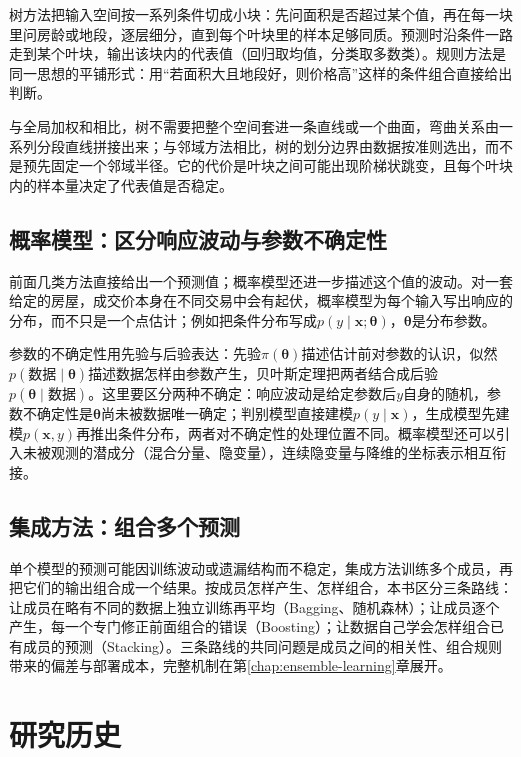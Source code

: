 树方法把输入空间按一系列条件切成小块：先问面积是否超过某个值，再在每一块里问房龄或地段，逐层细分，直到每个叶块里的样本足够同质。预测时沿条件一路走到某个叶块，输出该块内的代表值（回归取均值，分类取多数类）。规则方法是同一思想的平铺形式：用“若面积大且地段好，则价格高”这样的条件组合直接给出判断。

与全局加权和相比，树不需要把整个空间套进一条直线或一个曲面，弯曲关系由一系列分段直线拼接出来；与邻域方法相比，树的划分边界由数据按准则选出，而不是预先固定一个邻域半径。它的代价是叶块之间可能出现阶梯状跳变，且每个叶块内的样本量决定了代表值是否稳定。

\subsection{概率模型：区分响应波动与参数不确定性}
\label{sec:classic-overview-probability}

前面几类方法直接给出一个预测值；概率模型还进一步描述这个值的波动。对一套给定的房屋，成交价本身在不同交易中会有起伏，概率模型为每个输入写出响应的分布，而不只是一个点估计；例如把条件分布写成$p(y\mid\bm x;\bm\theta)$，$\bm\theta$是分布参数。

参数的不确定性用先验与后验表达：先验$\pi(\bm\theta)$描述估计前对参数的认识，似然$p(\text{数据}\mid\bm\theta)$描述数据怎样由参数产生，贝叶斯定理把两者结合成后验$p(\bm\theta\mid\text{数据})$。这里要区分两种不确定：响应波动是给定参数后$y$自身的随机，参数不确定性是$\bm\theta$尚未被数据唯一确定；判别模型直接建模$p(y\mid\bm x)$，生成模型先建模$p(\bm x,y)$再推出条件分布，两者对不确定性的处理位置不同。概率模型还可以引入未被观测的潜成分（混合分量、隐变量），连续隐变量与降维的坐标表示相互衔接。

\subsection{集成方法：组合多个预测}
\label{sec:classic-overview-ensemble}

单个模型的预测可能因训练波动或遗漏结构而不稳定，集成方法训练多个成员，再把它们的输出组合成一个结果。按成员怎样产生、怎样组合，本书区分三条路线：让成员在略有不同的数据上独立训练再平均（Bagging、随机森林）；让成员逐个产生，每一个专门修正前面组合的错误（Boosting）；让数据自己学会怎样组合已有成员的预测（Stacking）。三条路线的共同问题是成员之间的相关性、组合规则带来的偏差与部署成本，完整机制在第\ref{chap:ensemble-learning}章展开。

\section{研究历史}
\label{sec:classic-history}

